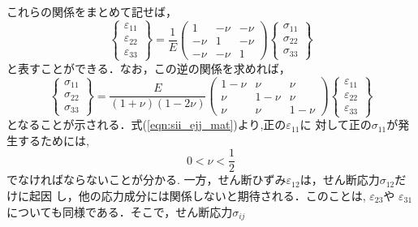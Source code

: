 \documentclass[10pt,a4j]{jarticle}
\begin{document}
これらの関係をまとめて記せば，
\begin{equation}
	\left\{ 
	\begin{array}{*{20}{c}}
	\varepsilon _{11}\\
	\varepsilon _{22}\\
	\varepsilon _{33}
	\end{array}
	\right\} 
	= 
	\frac{1}{E}\left( 
	\begin{array}{*{20}{c}}
	1& - \nu & - \nu \\
	 - \nu &1& - \nu \\
	 - \nu & - \nu &1
	\end{array}
	\right)
	\left\{ 
	\begin{array}{*{20}{c}}
	\sigma _{11}\\
	\sigma _{22}\\
	\sigma _{33}
	\end{array} 
	\right\}
	\label{eqn:eii_sjj_mat}
\end{equation}
と表すことができる．なお，この逆の関係を求めれば，
\begin{equation}
	\left\{ 
	\begin{array}{*{20}{c}}
		\sigma _{11}\\
		\sigma _{22}\\
		\sigma _{33}
	\end{array} 
	\right\} 
	= 
	\frac{E}{\left( 1 + \nu  \right)\left( 1 - 2\nu  \right)}
	\left( 
		\begin{array}{*{20}{c}}
		1 - \nu & \nu &\nu \\
		\nu & 1 - \nu &\nu \\
		\nu &\nu &1 - \nu 
		\end{array}
	\right)
	\left\{ 
		\begin{array}{*{20}{c}}
		\varepsilon _{11}\\
		\varepsilon _{22}\\
		\varepsilon _{33}
		\end{array}
	\right\}
	\label{eqn:sii_ejj_mat}
\end{equation}
となることが示される．式(\ref{eqn:sii_ejj_mat})より,正の$\varepsilon_{11}$に
対して正の$\sigma_{11}$が発生するためには,
\begin{equation}
	0< \nu < \frac{1}{2} 
\end{equation}
でなければならないことが分かる.
一方，せん断ひずみ$\varepsilon_{12}$は，せん断応力$\sigma_{12}$だけに起因
し，他の応力成分には関係しないと期待される．このことは, $\varepsilon_{23}$や
$\varepsilon_{31}$についても同様である．そこで，せん断応力$\sigma_{ij}$
\end{document}
